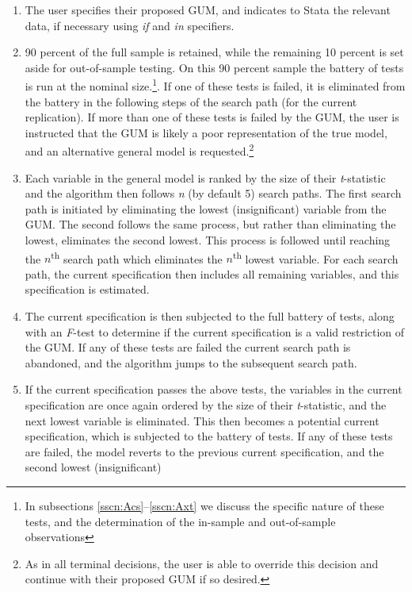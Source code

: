 \documentclass{article}[11pt]
\begin{document}
\begin{spacing}{1.2}
\begin{enumerate}
 \item The user specifies their proposed GUM, and indicates to Stata the relevant data, if necessary using
 \emph{if} and \emph{in} specifiers.
 \item 90 percent of the full sample is retained, while the remaining 10 percent is set aside for out-of-sample 
 testing.  On this 90 percent sample the battery of tests is run at the nominal size.\footnote{In subsections 
 \ref{sscn:Acs}--\ref{sscn:Axt} we discuss the specific nature of these tests, and the determination of the
 in-sample and out-of-sample observations}.  If one of these tests is failed, it is eliminated from the battery
 in the following steps of the search path (for the current replication).  If more than one of these tests is 
 failed by the GUM, the user is instructed that the GUM is likely a poor representation of the true model, and
 an alternative general model is requested.\footnote{As in all terminal decisions, the user is able to override
 this decision and continue with their proposed GUM if so desired.}
 \item Each variable in the general model is ranked by the size of their \emph{t}-statistic and the algorithm 
 then follows \emph{n} (by default 5) search paths.  The first search path is initiated by eliminating the lowest
 (insignificant) variable from the GUM.  The second follows the same process, but rather than eliminating the
 lowest, eliminates the second lowest.  This process is followed until reaching the $n$\textsuperscript{th} search 
 path which eliminates the $n$\textsuperscript{th} lowest variable.  For each search path, the current specification
 then includes all remaining variables, and this specification is estimated.
 \item The current specification is then subjected to the full battery of tests, along with an \emph{F}-test to
 determine if the current specification is a valid restriction of the GUM.  If any of these tests are failed the
 current search path is abandoned, and the algorithm jumps to the subsequent search path.
 \item If the current specification passes the above tests, the variables in the current specification are once
 again ordered by the size of their \emph{t}-statistic, and the next lowest variable is eliminated.  This then
 becomes a potential current specification, which is subjected to the battery of tests.  If any of these 
 tests are failed, the model reverts to the previous current specification, and the second lowest (insignificant) 

\end{enumerate}
\end{spacing}
\end{document}
